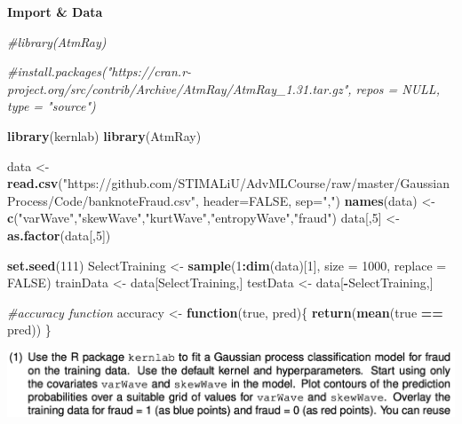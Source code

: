 \documentclass[
]{article}
\newenvironment{Shaded}{\begin{snugshade}}{\end{snugshade}}
\newcommand{\AttributeTok}[1]{\textcolor[rgb]{0.13,0.29,0.53}{#1}}
\newcommand{\CommentTok}[1]{\textcolor[rgb]{0.56,0.35,0.01}{\textit{#1}}}
\newcommand{\ConstantTok}[1]{\textcolor[rgb]{0.56,0.35,0.01}{#1}}
\newcommand{\ControlFlowTok}[1]{\textcolor[rgb]{0.13,0.29,0.53}{\textbf{#1}}}
\newcommand{\DecValTok}[1]{\textcolor[rgb]{0.00,0.00,0.81}{#1}}
\newcommand{\FunctionTok}[1]{\textcolor[rgb]{0.13,0.29,0.53}{\textbf{#1}}}
\newcommand{\NormalTok}[1]{#1}
\newcommand{\OtherTok}[1]{\textcolor[rgb]{0.56,0.35,0.01}{#1}}
\newcommand{\SpecialCharTok}[1]{\textcolor[rgb]{0.81,0.36,0.00}{\textbf{#1}}}
\newcommand{\StringTok}[1]{\textcolor[rgb]{0.31,0.60,0.02}{#1}}
\begin{document}
\textbf{Import \& Data}

\begin{Shaded}
\begin{Highlighting}[]
\CommentTok{\#library(AtmRay)}

\CommentTok{\#install.packages("https://cran.r{-}project.org/src/contrib/Archive/AtmRay/AtmRay\_1.31.tar.gz", repos = NULL, type = "source")}

\FunctionTok{library}\NormalTok{(kernlab)}
\FunctionTok{library}\NormalTok{(AtmRay)}

\NormalTok{data }\OtherTok{\textless{}{-}} \FunctionTok{read.csv}\NormalTok{(}\StringTok{"https://github.com/STIMALiU/AdvMLCourse/raw/master/GaussianProcess/Code/banknoteFraud.csv"}\NormalTok{, }\AttributeTok{header=}\ConstantTok{FALSE}\NormalTok{, }\AttributeTok{sep=}\StringTok{","}\NormalTok{) }
\FunctionTok{names}\NormalTok{(data) }\OtherTok{\textless{}{-}} \FunctionTok{c}\NormalTok{(}\StringTok{"varWave"}\NormalTok{,}\StringTok{"skewWave"}\NormalTok{,}\StringTok{"kurtWave"}\NormalTok{,}\StringTok{"entropyWave"}\NormalTok{,}\StringTok{"fraud"}\NormalTok{) }
\NormalTok{data[,}\DecValTok{5}\NormalTok{] }\OtherTok{\textless{}{-}} \FunctionTok{as.factor}\NormalTok{(data[,}\DecValTok{5}\NormalTok{])}

\FunctionTok{set.seed}\NormalTok{(}\DecValTok{111}\NormalTok{)}
\NormalTok{SelectTraining }\OtherTok{\textless{}{-}} \FunctionTok{sample}\NormalTok{(}\DecValTok{1}\SpecialCharTok{:}\FunctionTok{dim}\NormalTok{(data)[}\DecValTok{1}\NormalTok{], }\AttributeTok{size =} \DecValTok{1000}\NormalTok{, }\AttributeTok{replace =} \ConstantTok{FALSE}\NormalTok{)}
\NormalTok{trainData }\OtherTok{\textless{}{-}}\NormalTok{ data[SelectTraining,]}
\NormalTok{testData }\OtherTok{\textless{}{-}}\NormalTok{ data[}\SpecialCharTok{{-}}\NormalTok{SelectTraining,]}

\CommentTok{\#accuracy function}
\NormalTok{accuracy }\OtherTok{\textless{}{-}} \ControlFlowTok{function}\NormalTok{(true, pred)\{}
  \FunctionTok{return}\NormalTok{(}\FunctionTok{mean}\NormalTok{(true }\SpecialCharTok{==}\NormalTok{ pred))}
\NormalTok{\}}
\end{Highlighting}
\end{Shaded}

\includegraphics{images/Screenshot 2024-10-13 at 20.10.54.png}
\end{document}
